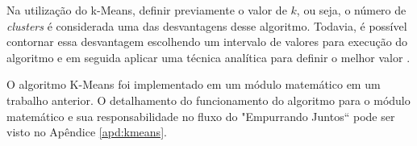 Na utilização do k-Means, definir previamente o valor de $k$, ou seja, o número de \textit{clusters} é considerada uma das desvantagens desse algoritmo. Todavia,
é possível contornar essa desvantagem escolhendo um intervalo de valores para execução do algoritmo e em seguida aplicar
uma técnica analítica para definir o melhor valor \cite{han2011data}.

O algoritmo K-Means foi implementado em um módulo matemático em um trabalho anterior. O detalhamento do funcionamento do algoritmo
para o módulo matemático e sua responsabilidade no fluxo do "Empurrando Juntos`` pode ser visto no Apêndice \ref{apd:kmeans}.

% 
% 
% 
% 
% 
% 
% 
% 
% 
% 
